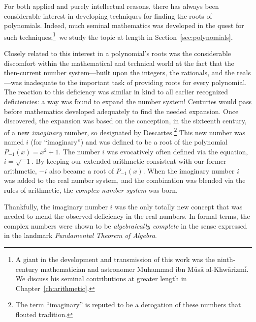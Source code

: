 \medskip


For both applied and purely intellectual reasons, there has always been considerable interest in developing techniques for finding the roots of polynomials.  Indeed, much seminal mathematics was developed in the quest for such techniques;\footnote{A giant in the development and transmission of this work was the ninth-century mathematician and astronomer Muhammad ibn M$\bar{\mbox{u}}$s$\bar{\mbox{a}}$ al-Khw$\bar{\mbox{a}}$rizm$\bar{\mbox{i}}$.  We discuss his seminal contributions at greater length in Chapter~\ref{ch:arithmetic}.}~we study the topic at length in Section~\ref{sec:polynomials}.

\smallskip

  

Closely related to this interest in a polynomial's roots was the considerable discomfort within the mathematical and technical world at the fact that the then-current number system---built upon the integers, the rationals, and the reals---was inadequate to the important task of providing roots for every polynomial.  The reaction to this deficiency was similar in kind to all earlier recognized deficiencies: a way was found to expand the number system!  Centuries would pass before mathematics developed adequately to find the needed expansion.  Once discovered, the expansion was based on the conception, in the sixteenth century, of a new {\it imaginary} number, so designated by Descartes.\footnote{The term ``imaginary'' is reputed to be a derogation of these numbers that flouted tradition.}  This new number was named $i$ (for ``imaginary'') and was defined to be a root of the polynomial $P_{-1}(x) = x^2 +1$.  The number $i$ was evocatively often defined via the equation, $i = \sqrt{-1}$.  By keeping our extended arithmetic consistent with our former arithmetic, $-i$ also became a root of $P_{-1}(x)$.  When the imaginary number $i$ was added to the real number system, and the combination was blended via the rules of arithmetic, the {\it complex number system} was born.

\smallskip

 
Thankfully, the imaginary number $i$ was the only totally new concept that was needed to mend the observed deficiency in the real numbers.  In formal terms, the complex numbers were shown to be {\it algebraically complete} in the sense expressed in the landmark {\it Fundamental Theorem of Algebra}.

